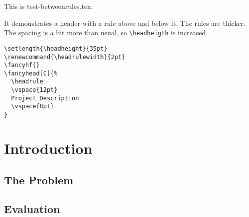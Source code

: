 \documentclass[openany]{book}
\renewcommand{\headrulewidth}{2pt}
\begin{document}
\tableofcontents

\bigskip

\noindent
\begin{boxedminipage}{\textwidth}
  This is test-betweenrules.tex.

  It demonstrates a header with a rule above and below it. The rules are thicker. 
  The spacing is a bit more than usual, so \verb|\headheigth| is increased.

\begin{verbatim}
\setlength{\headheight}{35pt}
\renewcommand{\headrulewidth}{2pt}
\fancyhf{}
\fancyhead[C]{%
  \headrule
  \vspace{12pt}
  Project Description
  \vspace{8pt}
}
\end{verbatim}
\end{boxedminipage}


\chapter{Introduction}
\thispagestyle{fancy}

\lipsum[1]

\section{The Problem}
\label{sec:problem}

\lipsum[2-3]

\section{Evaluation}

\lipsum[3-5]
\end{document}
